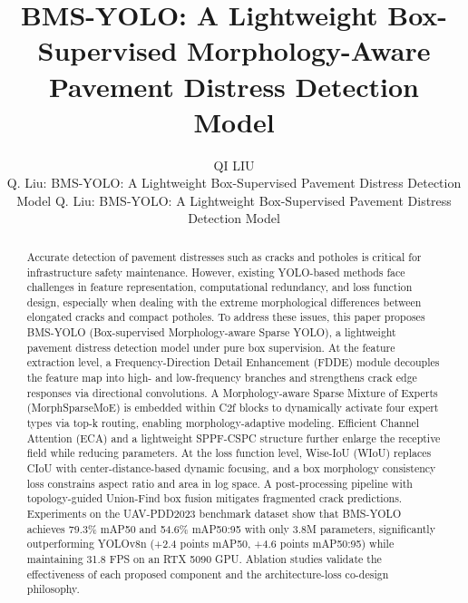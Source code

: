 \documentclass{ieeeaccess}
\begin{document}

\title{BMS-YOLO: A Lightweight Box-Supervised Morphology-Aware Pavement Distress Detection Model}

\author{\uppercase{Qi Liu}
\address[1]{Department of Civil Engineering, University Name, City, Country (e-mail: qi.liu@university.edu)}


\markboth
{Q. Liu: BMS-YOLO: A Lightweight Box-Supervised Pavement Distress Detection Model}
{Q. Liu: BMS-YOLO: A Lightweight Box-Supervised Pavement Distress Detection Model}


\begin{abstract}
Accurate detection of pavement distresses such as cracks and potholes is critical for infrastructure safety maintenance. However, existing YOLO-based methods face challenges in feature representation, computational redundancy, and loss function design, especially when dealing with the extreme morphological differences between elongated cracks and compact potholes. To address these issues, this paper proposes BMS-YOLO (Box-supervised Morphology-aware Sparse YOLO), a lightweight pavement distress detection model under pure box supervision. At the feature extraction level, a Frequency-Direction Detail Enhancement (FDDE) module decouples the feature map into high- and low-frequency branches and strengthens crack edge responses via directional convolutions. A Morphology-aware Sparse Mixture of Experts (MorphSparseMoE) is embedded within C2f blocks to dynamically activate four expert types via top-k routing, enabling morphology-adaptive modeling. Efficient Channel Attention (ECA) and a lightweight SPPF-CSPC structure further enlarge the receptive field while reducing parameters. At the loss function level, Wise-IoU (WIoU) replaces CIoU with center-distance-based dynamic focusing, and a box morphology consistency loss constrains aspect ratio and area in log space. A post-processing pipeline with topology-guided Union-Find box fusion mitigates fragmented crack predictions. Experiments on the UAV-PDD2023 benchmark dataset show that BMS-YOLO achieves 79.3\% mAP50 and 54.6\% mAP50:95 with only 3.8M parameters, significantly outperforming YOLOv8n (+2.4 points mAP50, +4.6 points mAP50:95) while maintaining 31.8 FPS on an RTX 5090 GPU. Ablation studies validate the effectiveness of each proposed component and the architecture-loss co-design philosophy.
\end{abstract}

}
\end{document}
